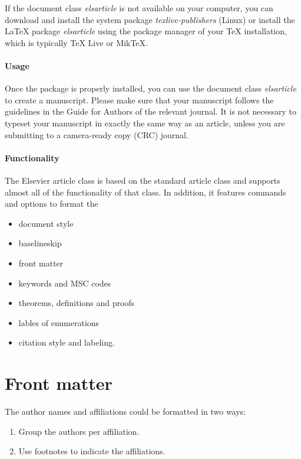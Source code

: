 \documentclass[]{elsarticle} %
\begin{document}
If the document class \emph{elsarticle} is not available on your
computer, you can download and install the system package
\emph{texlive-publishers} (Linux) or install the LaTeX package
\emph{elsarticle} using the package manager of your TeX installation,
which is typically TeX Live or MikTeX.

\hypertarget{usage}{%
\paragraph{Usage}\label{usage}}

Once the package is properly installed, you can use the document class
\emph{elsarticle} to create a manuscript. Please make sure that your
manuscript follows the guidelines in the Guide for Authors of the
relevant journal. It is not necessary to typeset your manuscript in
exactly the same way as an article, unless you are submitting to a
camera-ready copy (CRC) journal.

\hypertarget{functionality}{%
\paragraph{Functionality}\label{functionality}}

The Elsevier article class is based on the standard article class and
supports almost all of the functionality of that class. In addition, it
features commands and options to format the

\begin{itemize}
\item
  document style
\item
  baselineskip
\item
  front matter
\item
  keywords and MSC codes
\item
  theorems, definitions and proofs
\item
  lables of enumerations
\item
  citation style and labeling.
\end{itemize}

\hypertarget{front-matter}{%
\section{Front matter}\label{front-matter}}

The author names and affiliations could be formatted in two ways:

\begin{enumerate}
\def\labelenumi{(\arabic{enumi})}
\item
  Group the authors per affiliation.
\item
  Use footnotes to indicate the affiliations.
\end{enumerate}
\end{document}
